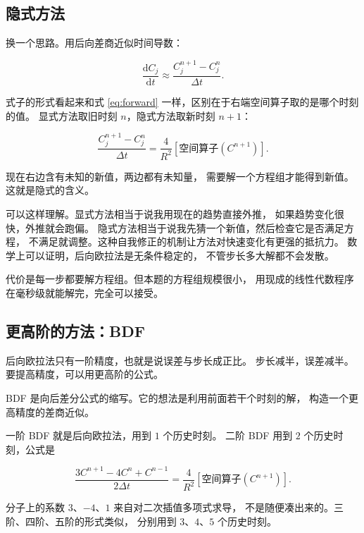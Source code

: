 \subsection{隐式方法}

换一个思路。用后向差商近似时间导数：

\begin{equation}
\frac{\mathrm{d}C_j}{\mathrm{d}t}\approx\frac{C_j^{n+1}-C_j^{n}}{\Delta t}.
\end{equation}

式子的形式看起来和式 \eqref{eq:forward} 一样，区别在于右端空间算子取的是哪个时刻的值。
显式方法取旧时刻 $n$，隐式方法取新时刻 $n+1$：

\begin{equation}
\frac{C_j^{n+1}-C_j^{n}}{\Delta t}
= \frac{4}{R^2}\left[\text{空间算子}(C^{n+1})\right].
\label{eq:implicit}
\end{equation}

现在右边含有未知的新值，两边都有未知量，
需要解一个方程组才能得到新值。这就是隐式的含义。

可以这样理解。显式方法相当于说我用现在的趋势直接外推，
如果趋势变化很快，外推就会跑偏。
隐式方法相当于说我先猜一个新值，然后检查它是否满足方程，
不满足就调整。这种自我修正的机制让方法对快速变化有更强的抵抗力。
数学上可以证明，后向欧拉法是无条件稳定的，
不管步长多大解都不会发散。

代价是每一步都要解方程组。但本题的方程组规模很小，
用现成的线性代数程序在毫秒级就能解完，完全可以接受。

\subsection{更高阶的方法：BDF}

后向欧拉法只有一阶精度，也就是说误差与步长成正比。
步长减半，误差减半。要提高精度，可以用更高阶的公式。

BDF 是向后差分公式的缩写。它的想法是利用前面若干个时刻的解，
构造一个更高精度的差商近似。

一阶 BDF 就是后向欧拉法，用到 $1$ 个历史时刻。
二阶 BDF 用到 $2$ 个历史时刻，公式是

\begin{equation}
\frac{3C^{n+1}-4C^{n}+C^{n-1}}{2\Delta t}
= \frac{4}{R^2}\left[\text{空间算子}(C^{n+1})\right].
\end{equation}

分子上的系数 $3$、$-4$、$1$ 来自对二次插值多项式求导，
不是随便凑出来的。三阶、四阶、五阶的形式类似，
分别用到 $3$、$4$、$5$ 个历史时刻。

